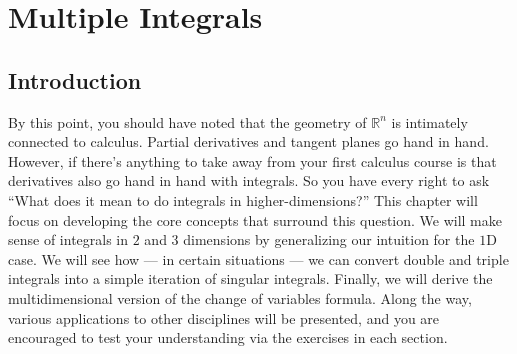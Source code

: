 \chapter{Multiple Integrals}
\setcounter{exercisecounter}{0}

\setcounter{thmcounter}{0}
\section{Introduction}

By this point, you should have noted that the geometry of $\mathbb{R}^n$ is intimately connected to calculus. Partial derivatives and tangent planes go hand in hand. However, if there's anything to take away from your first calculus course is that derivatives also go hand in hand with integrals. So you have every right to ask ``What does it mean to do integrals in higher-dimensions?'' This chapter will focus on developing the core concepts that surround this question. We will make sense of integrals in $2$ and $3$ dimensions by generalizing our intuition for the $1\text{D}$ case. We will see how --- in certain situations --- we can convert double and triple integrals into a simple iteration of singular integrals. Finally, we will derive the multidimensional version of the change of variables formula. Along the way, various applications to other disciplines will be presented, and you are encouraged to test your understanding via the exercises in each section. 

